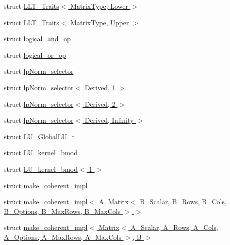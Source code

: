 \begin{DoxyCompactItemize}
\item 
struct \hyperlink{struct_eigen_1_1internal_1_1_l_l_t___traits_3_01_matrix_type_00_01_lower_01_4}{L\+L\+T\+\_\+\+Traits$<$ Matrix\+Type, Lower $>$}
\item 
struct \hyperlink{struct_eigen_1_1internal_1_1_l_l_t___traits_3_01_matrix_type_00_01_upper_01_4}{L\+L\+T\+\_\+\+Traits$<$ Matrix\+Type, Upper $>$}
\item 
struct \hyperlink{struct_eigen_1_1internal_1_1logical__and__op}{logical\+\_\+and\+\_\+op}
\item 
struct \hyperlink{struct_eigen_1_1internal_1_1logical__or__op}{logical\+\_\+or\+\_\+op}
\item 
struct \hyperlink{struct_eigen_1_1internal_1_1lp_norm__selector}{lp\+Norm\+\_\+selector}
\item 
struct \hyperlink{struct_eigen_1_1internal_1_1lp_norm__selector_3_01_derived_00_011_01_4}{lp\+Norm\+\_\+selector$<$ Derived, 1 $>$}
\item 
struct \hyperlink{struct_eigen_1_1internal_1_1lp_norm__selector_3_01_derived_00_012_01_4}{lp\+Norm\+\_\+selector$<$ Derived, 2 $>$}
\item 
struct \hyperlink{struct_eigen_1_1internal_1_1lp_norm__selector_3_01_derived_00_01_infinity_01_4}{lp\+Norm\+\_\+selector$<$ Derived, Infinity $>$}
\item 
struct \hyperlink{struct_eigen_1_1internal_1_1_l_u___global_l_u__t}{L\+U\+\_\+\+Global\+L\+U\+\_\+t}
\item 
struct \hyperlink{struct_eigen_1_1internal_1_1_l_u__kernel__bmod}{L\+U\+\_\+kernel\+\_\+bmod}
\item 
struct \hyperlink{struct_eigen_1_1internal_1_1_l_u__kernel__bmod_3_011_01_4}{L\+U\+\_\+kernel\+\_\+bmod$<$ 1 $>$}
\item 
struct \hyperlink{struct_eigen_1_1internal_1_1make__coherent__impl}{make\+\_\+coherent\+\_\+impl}
\item 
struct \hyperlink{struct_eigen_1_1internal_1_1make__coherent__impl_3_01_a_00_01_matrix_3_01_b___scalar_00_01_b___r2332686f3180c2f2d848d1b5e8319450}{make\+\_\+coherent\+\_\+impl$<$ A, Matrix$<$ B\+\_\+\+Scalar, B\+\_\+\+Rows, B\+\_\+\+Cols, B\+\_\+\+Options, B\+\_\+\+Max\+Rows, B\+\_\+\+Max\+Cols $>$ $>$}
\item 
struct \hyperlink{struct_eigen_1_1internal_1_1make__coherent__impl_3_01_matrix_3_01_a___scalar_00_01_a___rows_00_0aa8f55819fa60ac5751cc2cbbaa58000}{make\+\_\+coherent\+\_\+impl$<$ Matrix$<$ A\+\_\+\+Scalar, A\+\_\+\+Rows, A\+\_\+\+Cols, A\+\_\+\+Options, A\+\_\+\+Max\+Rows, A\+\_\+\+Max\+Cols $>$, B $>$}

\end{DoxyCompactItemize}
